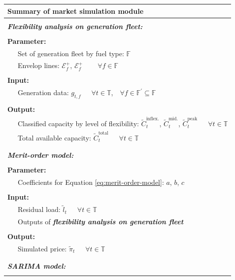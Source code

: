\begin{table}[h!]
	\small
	\begin{tabular}{L{0.95\textwidth}}
		\hline
		\textbf{Summary of market simulation module} \\
		\hline
		\\
		\textit{\textbf{Flexibility analysis on generation fleet:}}\\
		\\
		\textbf{Parameter:} \\
		~~~Set of generation fleet by fuel type: $\mathbb{F}$ \\
		~~~Envelop lines: $\mathcal{E}_f^+$, $\mathcal{E}_f^+$ ~~~ $\forall f \in \mathbb{F}$\\
		\\
		\textbf{Input:} \\
		~~~Generation data: $g_{t,f}$~~~$\forall t \in \mathbb{T}$,~~$\forall f \in \mathbb{F}^\prime  \subseteq \mathbb{F}$ \\
		\\
		\textbf{Output:} \\
		~~~Classified capacity by level of flexibility:  $\tilde{C}^{\text{inflex.}}_t$, $\tilde{C}^{\text{mid.}}_t$, $\tilde{C}^{\text{peak}}_t$~~~$\forall t \in \mathbb{T}$  \\
		~~~Total available capacity: $\tilde{C}^{\text{total}}_t$~~~$\forall t \in \mathbb{T}$
		\\
		\\
		\hline
		\\
		\textit{\textbf{Merit-order model:}}\\
		\\
		\textbf{Parameter:} \\
		~~~Coefficients for Equation \eqref{eq:merit-order-model}: $a$, $b$, $c$ \\
		\\
		\textbf{Input:} \\
		~~~Residual load: $\tilde{l}_t$~~~$\forall t \in \mathbb{T}$ \\
		~~~Outputs of \textit{\textbf{flexibility analysis on generation fleet}}
		\\
		\\
		\textbf{Output:} \\
		~~~Simulated price: $\tilde{\pi}_t$~~~$\forall t \in \mathbb{T}$ \\
		\\
		\hline
		\\
		\textit{\textbf{SARIMA model:}}\\
		\\

\end{tabular}
\end{table}
